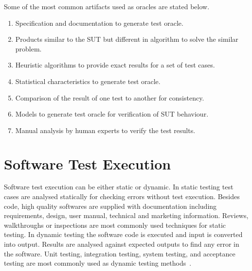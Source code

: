 Some of the most common artifacts used as oracles are stated below.
\begin{enumerate}
\item Specification and documentation to generate test oracle. 
\item Products similar to the SUT but different in algorithm to solve the similar problem.
\item Heuristic algorithms to provide exact results for a set of test cases. %
\item Statistical characteristics to generate test oracle. %
\item Comparison of the result of one test to another for consistency. %
\item Models to generate test oracle for verification of SUT behaviour. %
\item Manual analysis by human experts to verify the test results. %
\end{enumerate}

\section{Software Test Execution}
Software test execution can be either static or dynamic. In static testing test cases are analysed statically for checking errors without test execution. Besides code, high quality softwares are supplied with documentation including requirements, design, user manual, technical and marketing information. Reviews, walkthroughs or inspections are most commonly used techniques for static testing. In dynamic testing the software code is executed and input is converted into output. Results are analysed against expected outputs to find any error in the software. Unit testing, integration testing, system testing, and acceptance testing are most commonly used as dynamic testing methods~\cite{fairley1978tutorial}.




